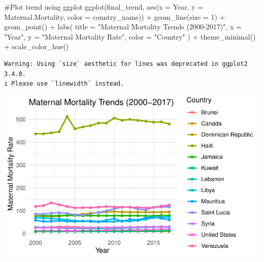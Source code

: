\documentclass[
  letterpaper,
  DIV=11,
  numbers=noendperiod]{scrartcl}
\newenvironment{Shaded}{\begin{snugshade}}{\end{snugshade}}
\newcommand{\AttributeTok}[1]{\textcolor[rgb]{0.40,0.45,0.13}{#1}}
\newcommand{\CommentTok}[1]{\textcolor[rgb]{0.37,0.37,0.37}{#1}}
\newcommand{\DecValTok}[1]{\textcolor[rgb]{0.68,0.00,0.00}{#1}}
\newcommand{\FunctionTok}[1]{\textcolor[rgb]{0.28,0.35,0.67}{#1}}
\newcommand{\NormalTok}[1]{\textcolor[rgb]{0.00,0.23,0.31}{#1}}
\newcommand{\SpecialCharTok}[1]{\textcolor[rgb]{0.37,0.37,0.37}{#1}}
\newcommand{\StringTok}[1]{\textcolor[rgb]{0.13,0.47,0.30}{#1}}
\begin{document}
\begin{Shaded}
\begin{Highlighting}[]
\CommentTok{\#Plot trend using ggplot}
\FunctionTok{ggplot}\NormalTok{(final\_trend, }\FunctionTok{aes}\NormalTok{(}\AttributeTok{x =}\NormalTok{ Year, }\AttributeTok{y =}\NormalTok{ Maternal.Mortality, }\AttributeTok{color =}\NormalTok{ country\_name)) }\SpecialCharTok{+}
  \FunctionTok{geom\_line}\NormalTok{(}\AttributeTok{size =} \DecValTok{1}\NormalTok{) }\SpecialCharTok{+}        
  \FunctionTok{geom\_point}\NormalTok{() }\SpecialCharTok{+}               
  \FunctionTok{labs}\NormalTok{(}
    \AttributeTok{title =} \StringTok{"Maternal Mortality Trends (2000{-}2017)"}\NormalTok{,}
    \AttributeTok{x =} \StringTok{"Year"}\NormalTok{,}
    \AttributeTok{y =} \StringTok{"Maternal Mortality Rate"}\NormalTok{,}
    \AttributeTok{color =} \StringTok{"Country"}
\NormalTok{  ) }\SpecialCharTok{+}
  \FunctionTok{theme\_minimal}\NormalTok{() }\SpecialCharTok{+}           
  \FunctionTok{scale\_color\_hue}\NormalTok{()}
\end{Highlighting}
\end{Shaded}

\begin{verbatim}
Warning: Using `size` aesthetic for lines was deprecated in ggplot2 3.4.0.
i Please use `linewidth` instead.
\end{verbatim}

\includegraphics{figure1_files/figure-pdf/unnamed-chunk-1-1.pdf}
\end{document}
